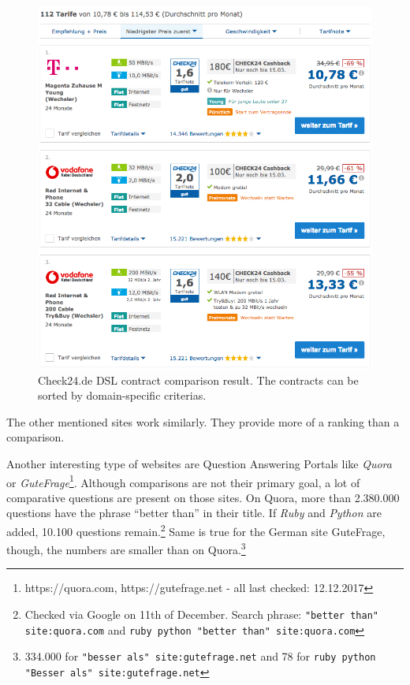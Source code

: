 \begin{figure}[h]
	\includegraphics[width=1\textwidth,scale=0.8]{images/ds-sys/check24_2}
	\caption{Check24.de DSL contract comparison result. The contracts can be sorted by domain-specific criterias.}
	\label{img:check24_2}
\end{figure}

The other mentioned sites work similarly. They provide more of a ranking than a comparison.\newline


Another interesting type of websites are Question Answering Portals like \emph{Quora} or \emph{GuteFrage}\footnote{https://quora.com, https://gutefrage.net - all last checked: 12.12.2017}. Although comparisons are not their primary goal, a lot of comparative questions are present on those sites.
On Quora, more than 2.380.000 questions have the phrase \enquote{better than} in their title. If \emph{Ruby} and \emph{Python} are added, 10.100 questions remain.\footnote{Checked via Google on 11th of December. Search phrase: \texttt{"better than" site:quora.com} and \texttt{ruby python "better than" site:quora.com}}
Same is true for the German site GuteFrage, though, the numbers are smaller than on Quora.\footnote{334.000 for \texttt{"besser als" site:gutefrage.net} and 78 for \texttt{ruby python "Besser als" site:gutefrage.net}}\newline


